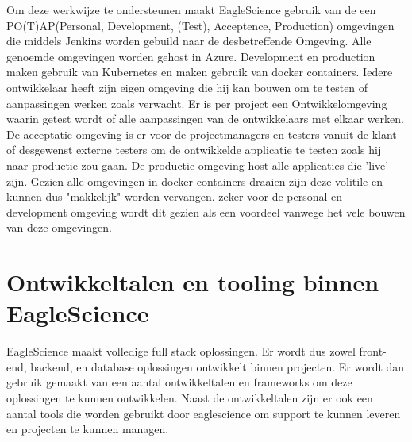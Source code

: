 Om deze werkwijze te ondersteunen maakt EagleScience gebruik van de een PO(T)AP(Personal, Development, (Test), Acceptence, Production) omgevingen die middels Jenkins worden gebuild naar de desbetreffende Omgeving. Alle genoemde omgevingen worden gehost in Azure. Development en production maken gebruik van Kubernetes en maken gebruik van docker containers. Iedere ontwikkelaar heeft zijn eigen omgeving die hij kan bouwen om te testen of aanpassingen werken zoals verwacht. Er is per project een Ontwikkelomgeving waarin getest wordt of alle aanpassingen van de ontwikkelaars met elkaar werken. De acceptatie omgeving is er voor de projectmanagers en testers vanuit de klant of desgewenst externe testers om de ontwikkelde applicatie te testen zoals hij naar productie zou gaan. De productie omgeving host alle applicaties die 'live' zijn. Gezien alle omgevingen in docker containers draaien zijn deze volitile en kunnen dus "makkelijk" worden vervangen. zeker voor de personal en development omgeving wordt dit gezien als een voordeel vanwege het vele bouwen van deze omgevingen.
\section{Ontwikkeltalen en tooling binnen EagleScience}\label{sec:ontwikkeltalen-en-tooling-binnen-eaglescience}
EagleScience maakt volledige full stack oplossingen. Er wordt dus zowel front-end, backend, en database oplossingen ontwikkelt binnen projecten. Er wordt dan gebruik gemaakt van een aantal ontwikkeltalen en frameworks om deze oplossingen te kunnen ontwikkelen. Naast de ontwikkeltalen zijn er ook een aantal tools die worden gebruikt door eaglescience om support te kunnen leveren en projecten te kunnen managen.

